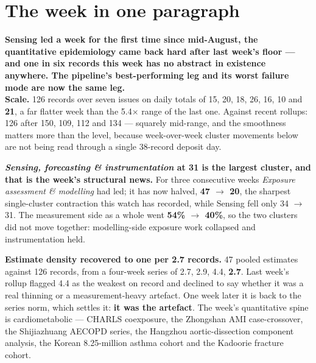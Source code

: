 \documentclass[10pt]{article}
\begin{document}
\vspace{6mm}

\section*{\sffamily\bfseries\color{Deep}The week in one paragraph}
\vspace{-1.5mm}{\color{Teal}\rule{\linewidth}{1.1pt}}\vspace{2.5mm}

\begin{keybox}
{\sffamily\bfseries\small\color{Deep}Sensing led a week for the first time since
mid-August, the quantitative epidemiology came back hard after last week's floor --- and
one in six records this week has no abstract in existence anywhere. The pipeline's
best-performing leg and its worst failure mode are now the same leg.}\\[1.4mm]
\footnotesize
\textbf{Scale.} 126 records over seven issues on daily totals of 15, 20, 18, 26, 16, 10
and \textbf{21}, a far flatter week than the 5.4$\times$ range of the last one. Against
recent rollups: 126 after 150, 109, 112 and 134 --- squarely mid-range, and the smoothness
matters more than the level, because week-over-week cluster movements below are not being
read through a single 38-record deposit day.

\textbf{\textit{Sensing, forecasting \& instrumentation} at 31 is the largest cluster, and
that is the week's structural news.} For three consecutive weeks \textit{Exposure
assessment \& modelling} had led; it has now halved, \textbf{47 $\rightarrow$ 20}, the
sharpest single-cluster contraction this watch has recorded, while Sensing fell only
34 $\rightarrow$ 31. The measurement side as a whole went \textbf{54\% $\rightarrow$
40\%}, so the two clusters did not move together: modelling-side exposure work
collapsed and instrumentation held.

\textbf{Estimate density recovered to one per 2.7 records.} 47 pooled estimates against
126 records, from a four-week series of 2.7, 2.9, 4.4, \textbf{2.7}. Last week's rollup
flagged 4.4 as the weakest on record and declined to say whether it was a real thinning
or a measurement-heavy artefact. One week later it is back to the series norm, which
settles it: \textbf{it was the artefact}. The week's quantitative spine is cardiometabolic
--- CHARLS coexposure, the Zhongshan AMI case-crossover, the Shijiazhuang AECOPD series,
the Hangzhou aortic-dissection component analysis, the Korean 8.25-million asthma cohort
and the Kadoorie fracture cohort.


\end{keybox}
\end{document}
